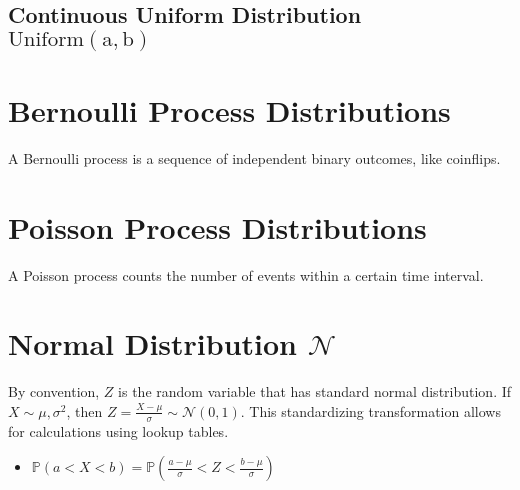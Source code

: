 \subsection{Continuous Uniform Distribution $\mathrm{Uniform(a,b)}$}




\section{Bernoulli Process Distributions}

A Bernoulli process is a sequence of independent binary outcomes, like coinflips.



\section{Poisson Process Distributions}

A Poisson process counts the number of events within a certain time interval. 

\section{Normal Distribution $\mathscr{N}$}

By convention, $Z$ is the random variable that has standard normal distribution. If $X \sim \mathscr{\mu,\sigma^2}$, then $Z = \frac{X-\mu}{\sigma} \sim \mathscr{N}(0,1)$. This standardizing transformation allows for calculations using lookup tables. 

\begin{itemize}
\item $\mathbb{P}(a<X<b)  = \mathbb{P}(\frac{a-\mu}{\sigma} < Z < \frac{b-\mu}{\sigma})$
\end{itemize} 